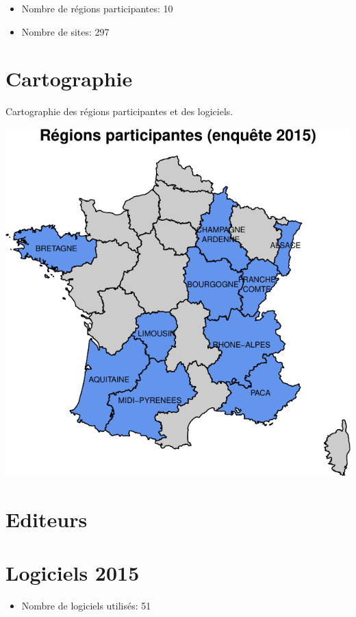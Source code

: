 \documentclass[]{article}
\begin{document}
\begin{itemize}
\itemsep1pt\parskip0pt
\item
  Nombre de régions participantes: 10
\item
  Nombre de sites: 297
\end{itemize}

\section{Cartographie}\label{cartographie}

Cartographie des régions participantes et des logiciels.

\includegraphics{septembre2015_files/figure-latex/carto_region-1.pdf}

\section{Editeurs}\label{editeurs}

\section{Logiciels 2015}\label{logiciels-2015}

\begin{itemize}
\itemsep1pt\parskip0pt
\item
  Nombre de logiciels utilisés: 51
\end{itemize}
\end{document}
